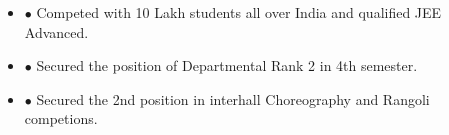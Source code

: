 \documentclass[a4paper,11pt]{article}
\newcommand{\resumeItemListStart}{\begin{justify}\begin{itemize}[leftmargin=3ex, rightmargin=2ex, noitemsep,labelsep=1.2mm,itemsep=0mm]\small}
\newcommand{\resumeItemListEnd}{\end{itemize}\end{justify}\vspace{-1.5mm}}
\begin{document}
\resumeItemListStart
\item[$\bullet$] Competed with 10 Lakh students all over India and qualified JEE Advanced.
\item[$\bullet$] Secured the position of Departmental Rank 2 in 4th semester.
\item[$\bullet$] Secured the 2nd position in interhall Choreography and Rangoli competions.
\resumeItemListEnd


\vspace{-2.5mm}

\vspace{0mm}

\end{document}

